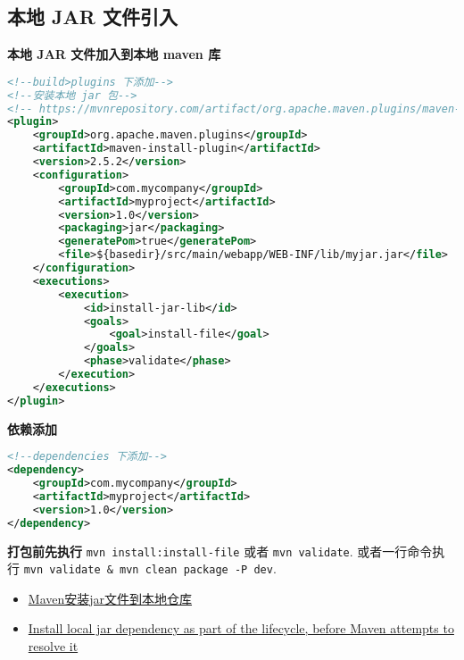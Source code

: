 \subsection{本地 JAR
文件引入}\label{ux672cux5730-jar-ux6587ux4ef6ux5f15ux5165}

\textbf{本地 JAR 文件加入到本地 maven 库}

\begin{lstlisting}[language=XML]
<!--build>plugins 下添加-->
<!--安装本地 jar 包-->
<!-- https://mvnrepository.com/artifact/org.apache.maven.plugins/maven-install-plugin -->
<plugin>
    <groupId>org.apache.maven.plugins</groupId>
    <artifactId>maven-install-plugin</artifactId>
    <version>2.5.2</version>
    <configuration>
        <groupId>com.mycompany</groupId>
        <artifactId>myproject</artifactId>
        <version>1.0</version>
        <packaging>jar</packaging>
        <generatePom>true</generatePom>
        <file>${basedir}/src/main/webapp/WEB-INF/lib/myjar.jar</file>
    </configuration>
    <executions>
        <execution>
            <id>install-jar-lib</id>
            <goals>
                <goal>install-file</goal>
            </goals>
            <phase>validate</phase>
        </execution>
    </executions>
</plugin>
\end{lstlisting}

\textbf{依赖添加}

\begin{lstlisting}[language=XML]
<!--dependencies 下添加-->
<dependency>
    <groupId>com.mycompany</groupId>
    <artifactId>myproject</artifactId>
    <version>1.0</version>
</dependency>
\end{lstlisting}

\textbf{打包前先执行} \lstinline!mvn install:install-file! 或者
\lstinline!mvn validate!. 或者一行命令执行
\lstinline!mvn validate & mvn clean package -P dev!.

\begin{itemize}
\tightlist
\item
  \href{https://www.cnblogs.com/xguo/archive/2013/06/04/3117894.html}{Maven安装jar文件到本地仓库}
\item
  \href{https://stackoverflow.com/questions/26618192/install-local-jar-dependency-as-part-of-the-lifecycle-before-maven-attempts-to}{Install
  local jar dependency as part of the lifecycle, before Maven attempts
  to resolve it}
\end{itemize}
